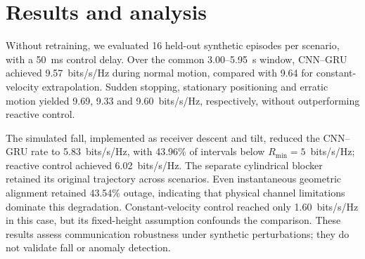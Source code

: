 \section{Results and analysis}
\label{sec:resultados}

Without retraining, we evaluated 16 held-out synthetic episodes per
scenario, with a 50~ms control delay. Over the common 3.00--5.95~s
window, CNN--GRU achieved 9.57~bits/s/Hz during normal motion,
compared with 9.64 for constant-velocity extrapolation.
Sudden stopping, stationary positioning and erratic motion yielded
9.69, 9.33 and 9.60~bits/s/Hz, respectively, without outperforming
reactive control.

The simulated fall, implemented as receiver descent and tilt,
reduced the CNN--GRU rate to 5.83~bits/s/Hz, with 43.96\%
of intervals below $R_{\min}=5$~bits/s/Hz; reactive control achieved
6.02~bits/s/Hz. The separate cylindrical blocker retained its
original trajectory across scenarios. Even instantaneous geometric
alignment retained 43.54\% outage, indicating that physical channel
limitations dominate this degradation. Constant-velocity control
reached only 1.60~bits/s/Hz in this case, but its fixed-height
assumption confounds the comparison. These results assess
communication robustness under synthetic perturbations; they do
not validate fall or anomaly detection.
